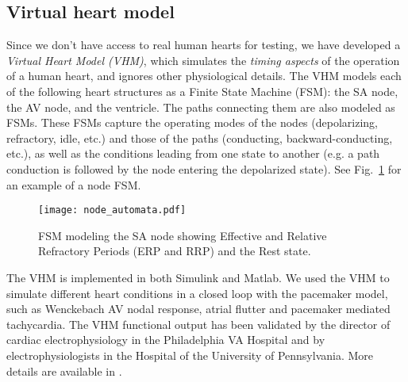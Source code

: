 \subsection{Virtual heart model}
\label{heartmodel}

Since we don't have access to real human hearts for testing, we have developed a \emph{Virtual Heart Model (VHM)}, which simulates the \emph{timing aspects} of the operation of a human heart, and ignores other physiological details.
The VHM models each of the following heart structures as a Finite State Machine (FSM): the SA node, the AV node, and the ventricle.
The paths connecting them are also modeled as FSMs.
These FSMs capture the operating modes of the nodes (depolarizing, refractory, idle, etc.) and those of the paths (conducting, backward-conducting, etc.), as well as the conditions leading from one state to another (e.g. a path conduction is followed by the node entering the depolarized state).
See Fig.~\ref{fig:FSMSA} for an example of a node FSM.
\begin{figure}[t]
\centering
\texttt{[image: node\_automata.pdf]}
\caption{FSM modeling the SA node showing Effective and Relative Refractory Periods (ERP and RRP) and the Rest state.}
\label{fig:FSMSA}
\end{figure}
The VHM is implemented in both Simulink and Matlab. 
We used the VHM to simulate different heart conditions in a closed loop with the pacemaker model, such as Wenckebach AV nodal response, atrial flutter and pacemaker mediated tachycardia.
The VHM functional output has been validated by the director of cardiac electrophysiology in the Philadelphia VA Hospital and by electrophysiologists in the Hospital of the University of Pennsylvania. 
More details are available in \cite{Jiang1}\cite{vhm_iccps11}\cite{embc10}.
